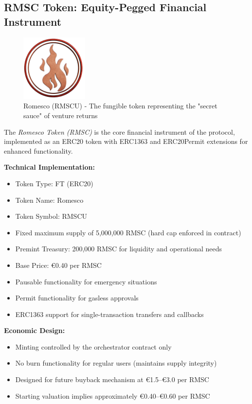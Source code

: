\documentclass[conference]{IEEEtran}
\begin{document}
\subsection{RMSC Token: Equity-Pegged Financial Instrument}

\begin{figure}[ht]
\centering
\includegraphics[width=0.3\textwidth]{rmsc_logo.png}
\caption{Romesco (RMSCU) - The fungible token representing the "secret sauce" of venture returns}
\label{fig:rmsc-logo}
\end{figure}

The \textit{Romesco Token (RMSC)} is the core financial instrument of the protocol, implemented as an ERC20 token with ERC1363 and ERC20Permit extensions for enhanced functionality.

\textbf{Technical Implementation:}
\begin{itemize}
    \item Token Type: FT (ERC20)
    \item Token Name: Romesco
    \item Token Symbol: RMSCU
    \item Fixed maximum supply of 5,000,000 RMSC (hard cap enforced in contract)
    \item Premint Treasury: 200,000 RMSC for liquidity and operational needs
    \item Base Price: €0.40 per RMSC
    \item Pausable functionality for emergency situations
    \item Permit functionality for gasless approvals
    \item ERC1363 support for single-transaction transfers and callbacks
\end{itemize}

\textbf{Economic Design:}
\begin{itemize}
    \item Minting controlled by the orchestrator contract only
    \item No burn functionality for regular users (maintains supply integrity)
    \item Designed for future buyback mechanism at €1.5–€3.0 per RMSC
    \item Starting valuation implies approximately €0.40–€0.60 per RMSC
\end{itemize}
\end{document}
